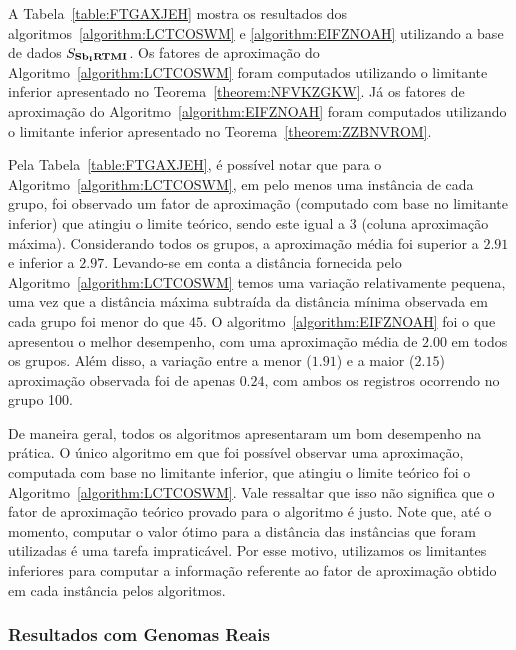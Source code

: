 A Tabela~\ref{table:FTGAXJEH} mostra os resultados dos algoritmos~\ref{algorithm:LCTCOSWM} e \ref{algorithm:EIFZNOAH} utilizando a base de dados $S_{\textbf{Sb\textsubscript{I}RTMI}}{}$. Os fatores de aproximação do Algoritmo~\ref{algorithm:LCTCOSWM} foram computados utilizando o limitante inferior apresentado no Teorema~\ref{theorem:NFVKZGKW}. Já os fatores de aproximação do Algoritmo~\ref{algorithm:EIFZNOAH} foram computados utilizando o limitante inferior apresentado no Teorema~\ref{theorem:ZZBNVROM}.



Pela Tabela~\ref{table:FTGAXJEH}, é possível notar que para o Algoritmo~\ref{algorithm:LCTCOSWM}, em pelo menos uma instância de cada grupo, foi observado um fator de aproximação (computado com base no limitante inferior) que atingiu o limite teórico, sendo este igual a $3$ (coluna aproximação máxima). Considerando todos os grupos, a aproximação média foi superior a $2.91$ e inferior a $2.97$. Levando-se em conta a distância fornecida pelo Algoritmo~\ref{algorithm:LCTCOSWM} temos uma variação relativamente pequena, uma vez que a distância máxima subtraída da distância mínima observada em cada grupo foi menor do que $45$. O algoritmo~\ref{algorithm:EIFZNOAH} foi o que apresentou o melhor desempenho, com uma aproximação média de $2.00$ em todos os grupos. Além disso, a variação entre a menor ($1.91$) e a maior ($2.15$) aproximação observada foi de apenas $0.24$, com ambos os registros ocorrendo no grupo 100. 


De maneira geral, todos os algoritmos apresentaram um bom desempenho na prática. O único algoritmo em que foi possível observar uma aproximação, computada com base no limitante inferior, que atingiu o limite teórico foi o Algoritmo~\ref{algorithm:LCTCOSWM}. Vale ressaltar que isso não significa que o fator de aproximação teórico provado para o algoritmo é justo. Note que, até o momento, computar o valor ótimo para a distância das instâncias que foram utilizadas é uma tarefa impraticável. Por esse motivo, utilizamos os limitantes inferiores para computar a informação referente ao fator de aproximação obtido em cada instância pelos algoritmos.


\subsubsection{Resultados com Genomas Reais}

